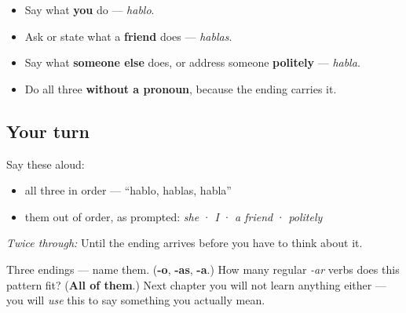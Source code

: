 \begin{grammarlens}[title={What you've built}]
\begin{itemize}
\raggedright
  \item Say what \textbf{you} do — \emph{hablo}.
  \item Ask or state what a \textbf{friend} does — \emph{hablas}.
  \item Say what \textbf{someone else} does, or address someone \textbf{politely} — \emph{habla}.
  \item Do all three \textbf{without a pronoun}, because the ending carries it.
\end{itemize}
\end{grammarlens}

\subsection*{Your turn}
Say these aloud:

\begin{itemize}
\raggedright
  \item all three in order — \textquotedblleft{}hablo, hablas, habla\textquotedblright{}
  \item them out of order, as prompted: \emph{she} · \emph{I} · \emph{a friend} · \emph{politely}
\end{itemize}

\emph{Twice through:} Until the ending arrives before you have to think about it.

\begin{tcolorbox}[breakable,colback=teal!4,colframe=teal!35!black,title={Before you move on}]
Three endings — name them. (\textbf{-o}, \textbf{-as}, \textbf{-a}.) How many regular \emph{-ar} verbs does this pattern fit? (\textbf{All of them}.) Next chapter you will not learn anything either — you will \emph{use} this to say something you actually mean.
\end{tcolorbox}
